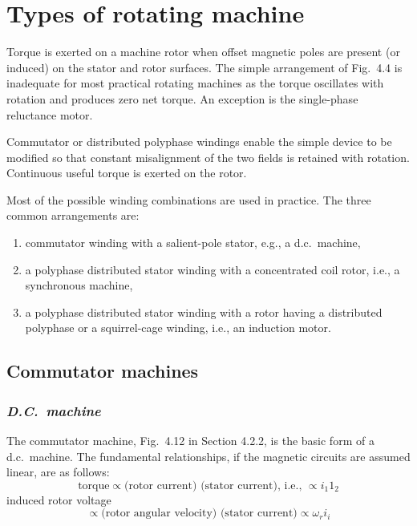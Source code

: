 \documentclass[a4paper,numbers=noenddot,12pt]{scrbook}
\begin{document}
            \section{Types of rotating machine}
            Torque is exerted on a machine rotor when offset magnetic poles are present (or induced) on the stator and rotor surfaces. The simple arrangement of Fig.\ 4.4 is inadequate for most practical rotating machines as the torque oscillates with rotation and produces zero net torque. An exception is the single-phase reluctance motor.

            Commutator or distributed polyphase windings enable the simple device to be modified so that constant misalignment of the two fields is retained with rotation. Continuous useful torque is exerted on the rotor.

            Most of the possible winding combinations are used in practice. The three common arrangements are:
            \begin{enumerate}
                \item commutator winding with a salient-pole stator, e.g., a d.c.\ machine, 
                \item a polyphase distributed stator winding with a concentrated coil rotor, i.e., a synchronous machine,
                \item a polyphase distributed stator winding with a rotor having a distributed polyphase or a squirrel-cage winding, i.e., an induction motor. 
            \end{enumerate}

            \subsection{Commutator machines}
            \subsubsection{\textit{D.C.\ machine}}
            The commutator machine, Fig.\ 4.12 in Section 4.2.2, is the basic form of a d.c.\ machine. The fundamental relationships, if the magnetic circuits are assumed linear, are as follows:
            \begin{equation*}
                \text{torque} \propto \text{(rotor current) (stator current), i.e., } \propto i_1 1_2
            \end{equation*}
            induced rotor voltage 
            \begin{equation*}
                \propto \text{(rotor angular velocity) (stator current)} \propto \omega_r i_i 
            \end{equation*}
\end{document}
